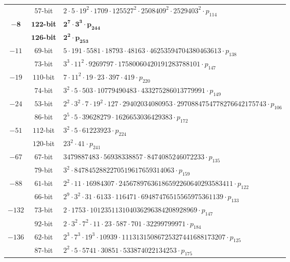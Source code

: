 \documentclass{article}
\theoremstyle{definition}
\begin{document}
\begin{table}[!ht]
\begin{tabularx}{\textwidth}{ccl}
 & $57$-bit & $2  \cdot 5  \cdot 19^{2}  \cdot 1709  \cdot 125527^{2}  \cdot 2508409^{2}  \cdot 2529403^{2}  \cdot p_{114}$\\
$\mathbf{-8}$ & $\mathbf{122}$\textbf{-bit} & $\mathbf{2^{7}  \cdot 3^{3}  \cdot p_{244}}$\\
 & $\mathbf{126}$\textbf{-bit} & $\mathbf{2^{2}  \cdot p_{253}}$\\
$-11$ & $69$-bit & $5  \cdot 191  \cdot 5581  \cdot 18793  \cdot 48163  \cdot 46253594704380463613  \cdot p_{138}$\\
 & $73$-bit & $3^{3}  \cdot 11^{2}  \cdot 9269797  \cdot 17580060420191283788101  \cdot p_{147}$\\
$-19$ & $110$-bit & $7  \cdot 11^{2}  \cdot 19  \cdot 23  \cdot 397  \cdot 419  \cdot p_{220}$\\
 & $74$-bit & $3^{2}  \cdot 5  \cdot 503  \cdot 10779490483  \cdot 433275286013779991  \cdot p_{149}$\\
$-24$ & $53$-bit & $2^{2}  \cdot 3^{2}  \cdot 7  \cdot 19^{2}  \cdot 127  \cdot 29402034080953  \cdot 2970884754778276642175743  \cdot p_{106}$\\
 & $86$-bit & $2^{5}  \cdot 5  \cdot 39628279  \cdot 1626653036429383  \cdot p_{172}$\\
$-51$ & $112$-bit & $3^{2}  \cdot 5  \cdot 61223923  \cdot p_{224}$\\
 & $120$-bit & $23^{2}  \cdot 41  \cdot p_{241}$\\
$-67$ & $67$-bit & $3479887483  \cdot 56938338857  \cdot 8474085246072233  \cdot p_{135}$\\
 & $79$-bit & $3^{2}  \cdot 8478452882270519617659314063  \cdot p_{159}$\\
$-88$ & $61$-bit & $2^{2}  \cdot 11  \cdot 16984307  \cdot 24567897636186592260640293583411  \cdot p_{122}$\\
 & $66$-bit & $2^{9}  \cdot 3^{2}  \cdot 31  \cdot 6133  \cdot 116471  \cdot 69487476515565975361139  \cdot p_{133}$\\
$-132$ & $73$-bit & $2  \cdot 1753  \cdot 101235113104036296384208928969  \cdot p_{147}$\\
 & $92$-bit & $2  \cdot 3^{2}  \cdot 7^{2}  \cdot 11  \cdot 23  \cdot 587  \cdot 701  \cdot 32299799971  \cdot p_{184}$\\
$-136$ & $62$-bit & $2^{3}  \cdot 7^{3}  \cdot 19^{3}  \cdot 10939  \cdot 11131315086725327441688173207  \cdot p_{125}$\\
 & $87$-bit & $2^{2}  \cdot 5  \cdot 5741  \cdot 30851  \cdot 533874022134253  \cdot p_{175}$\\

\end{tabularx}
\end{table}
\end{document}
